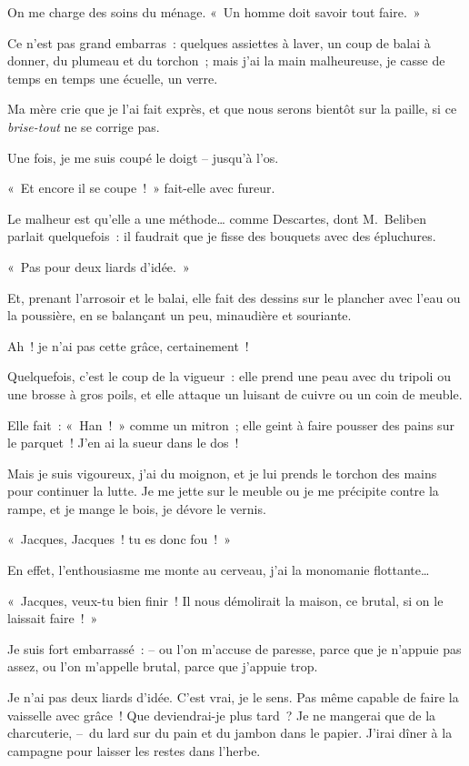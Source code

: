 \documentclass[french,twoside]{book} %
\begin{document}
\noindent On me charge des soins du ménage. « Un homme doit savoir tout faire. »\par
Ce n’est pas grand embarras : quelques assiettes à laver, un coup de balai à donner, du plumeau et du torchon ; mais j’ai la main malheureuse, je casse de temps en temps une écuelle, un verre.\par
Ma mère crie que je l’ai fait exprès, et que nous serons bientôt sur la paille, si ce \emph{brise-tout} ne se corrige pas.\par
Une fois, je me suis coupé le doigt – jusqu’à l’os.\par
« Et encore il se coupe ! » fait-elle avec fureur.\par
Le malheur est qu’elle a une méthode… comme Descartes, dont M. Beliben parlait quelquefois : il faudrait que je fisse des bouquets avec des épluchures.\par
\bigbreak
\noindent « Pas pour deux liards d’idée. »\par
Et, prenant l’arrosoir et le balai, elle fait des dessins sur le plancher avec l’eau ou la poussière, en se balançant un peu, minaudière et souriante.\par
Ah ! je n’ai pas cette grâce, certainement !\par
Quelquefois, c’est le coup de la vigueur : elle prend une peau avec du tripoli ou une brosse à gros poils, et elle attaque un luisant de cuivre ou un coin de meuble.\par
Elle fait : « Han ! » comme un mitron ; elle geint à faire pousser des pains sur le parquet ! J’en ai la sueur dans le dos !\par
Mais je suis vigoureux, j’ai du moignon, et je lui prends le torchon des mains pour continuer la lutte. Je me jette sur le meuble ou je me précipite contre la rampe, et je mange le bois, je dévore le vernis.\par
« Jacques, Jacques ! tu es donc fou ! »\par
En effet, l’enthousiasme me monte au cerveau, j’ai la monomanie flottante…\par
« Jacques, veux-tu bien finir ! Il nous démolirait la maison, ce brutal, si on le laissait faire ! »\par
Je suis fort embarrassé : – ou l’on m’accuse de paresse, parce que je n’appuie pas assez, ou l’on m’appelle brutal, parce que j’appuie trop.\par
Je n’ai pas deux liards d’idée. C’est vrai, je le sens. Pas même capable de faire la vaisselle avec grâce ! Que deviendrai-je plus tard ? Je ne mangerai que de la charcuterie, – du lard sur du pain et du jambon dans le papier. J’irai dîner à la campagne pour laisser les restes dans l’herbe.\par
\end{document}
